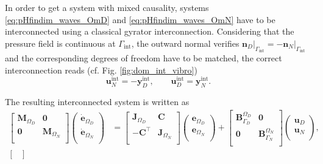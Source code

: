 In order to get a system with mixed causality, systems \eqref{eq:pHfindim_waves_OmD} and \eqref{eq:pHfindim_waves_OmN} have to be interconnected using a classical gyrator interconnection. Considering that the pressure field is continuous at $\Gamma_{\text{int}}$, the outward normal verifies $\bm{n}_D \vert_{\Gamma_{\text{int}}}= - \bm{n}_N \vert_{\Gamma_{\text{int}}}$ and the corresponding degrees of freedom have to be matched, the correct interconnection reads (cf. Fig. \ref{fig:dom_int_vibro})
\begin{equation}
\mathbf{u}_N^{\text{int}} = - \mathbf{y}_D^{\text{int}}, \qquad
\mathbf{u}_D^{\text{int}} = \mathbf{y}_N^{\text{int}}.
\end{equation}

The resulting interconnected system is written as
\begin{equation}\label{eq:pHfindim_waves_intOmDN}
\begin{aligned}
\begin{bmatrix}
\mathbf{M}_{\Omega_D} & \mathbf{0} \\
\mathbf{0} & \mathbf{M}_{\Omega_N} \\
\end{bmatrix}
\begin{pmatrix}
\dot{\mathbf{e}}_{\Omega_D} \\
\dot{\mathbf{e}}_{\Omega_N} \\
\end{pmatrix}
&= \begin{bmatrix}
\mathbf{J}_{\Omega_D} & \mathbf{C}\\
-\mathbf{C}^\top & \mathbf{J}_{\Omega_N} \\
\end{bmatrix} 
\begin{pmatrix}
{\mathbf{e}}_{\Omega_D} \\
{\mathbf{e}}_{\Omega_N} \\
\end{pmatrix} + 
\begin{bmatrix}
\mathbf{B}_{\Gamma_D}^{\Omega_D} & \mathbf{0}\\
\mathbf{0} & \mathbf{B}_{\Gamma_N}^{\Omega_N}\\
\end{bmatrix}
\begin{pmatrix}
\mathbf{u}_{D} \\
\mathbf{u}_{N}\\
\end{pmatrix}, \\
\begin{bmatrix}

\end{bmatrix}
\end{aligned}
\end{equation}
